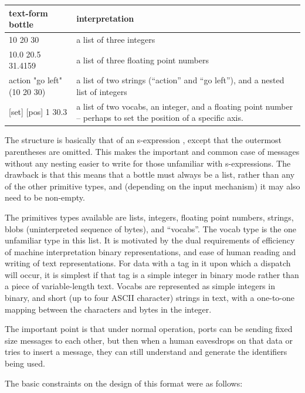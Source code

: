 \begin{center}
\begin{tabular}{lp{6cm}}
\hline\hline
{\bf text-form bottle} & {\bf interpretation} \\
\hline
10 20 30 & a list of three integers \\
10.0 20.5 31.4159 & a list of three floating point numbers \\
action "go left" (10 20 30) & a list of two strings (``action'' and ``go left''), and a nested list of integers \\
{[set] [pos] 1 30.3} & a list of two vocabs, an integer, and a floating
point number -- perhaps to set the position of a specific axis. \\
\hline\hline
\end{tabular}
\end{center}

The structure is basically that of an s-expression
\cite{rivest1997sexp}, except that the outermost parentheses are
omitted.  This makes the important and common case of messages without
any nesting easier to write for those unfamiliar with s-expressions.
The drawback is that this means that a bottle must always be a list,
rather than any of the other primitive types, and (depending on the
input mechanism) it may also need to be non-empty.

The primitives types available are lists, integers, floating point
numbers, strings, blobs (uninterpreted sequence of bytes), and
``vocabs''.  The vocab type is the one unfamiliar type in this list.
It is motivated by the dual requirements of efficiency of machine
interpretation binary representations, and ease of human reading and
writing of text representations.  For data with a tag in it upon which
a dispatch will occur, it is simplest if that tag is a simple integer
in binary mode rather than a piece of variable-length text.
Vocabs are represented as simple integers in binary, and short
(up to four ASCII character) strings in text, with a one-to-one
mapping between the characters and bytes in the integer.  


The important point is that under normal operation, ports can be
sending fixed size messages to each other, but then when a human
eavesdrops on that data or tries to insert a message, they can still
understand and generate the identifiers being used.


The basic constraints on the design of this format were as follows:

